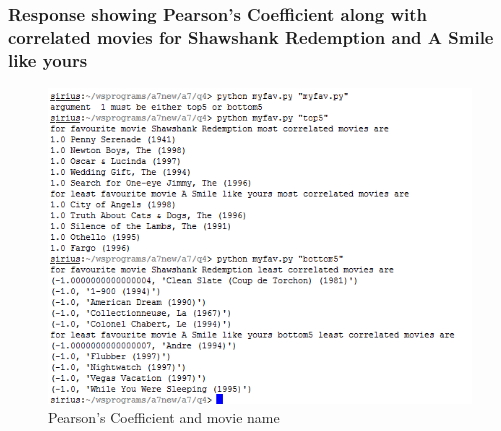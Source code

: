 \documentclass[12pt]{article}
\begin{document}
\subsubsection{Response showing Pearson's Coefficient along with correlated movies for Shawshank Redemption and A Smile like yours }
\begin{figure}[ht]
\includegraphics[scale=0.9]{../../q4/output.png}
\centering
\caption{Pearson's Coefficient and movie name}
\label{Pearson's Coefficient and movie name}
\end{figure}
\newpage










\cite{*}
\end{document}
